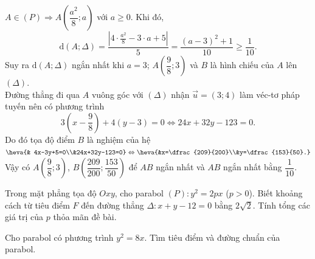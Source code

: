 \begin{ex}
{\begin{itemchoice}
			$A\in (P)\Rightarrow A\left( \dfrac{a^2}{8};a\right)$ với $a\ge 0$. Khi đó,  $$\mathrm{d}(A;\Delta)=\dfrac{\left|4\cdot \frac{a^2}{8} -3\cdot a+5 \right|}{5}=\dfrac{(a-3)^2+1}{10}\ge \dfrac{1}{10}.$$
			Suy ra  $\mathrm{d}(A;\Delta)$ ngắn nhất khi $a=3$; $A\left( \dfrac{9}{8};3\right)$ và $B$ là hình chiếu của $A$ lên $(\Delta)$.\\
			Đường thẳng đi qua $A$ vuông góc với $(\Delta)$ nhận $\overrightarrow{u}=(3;4)$ làm véc-tơ pháp tuyến nên có  phương trình
			$$3\left(x-\dfrac{9}{8}\right)+4(y-3)=0\Leftrightarrow 24x+32y-123=0.$$ 
			Do đó tọa độ điểm $B$ là  nghiệm của hệ $\heva{& 4x-3y+5=0\\&24x+32y-123=0}\Leftrightarrow \heva{&x=\dfrac{209}{200}\\&y=\dfrac{153}{50}.}$\\
			Vậy có $A\left(  \dfrac{9}{8};3\right)$, $B\left( \dfrac{209}{200};\dfrac{153}{50}\right)$ để $AB$ ngắn nhất và $AB$ ngắn nhất bằng $\dfrac{1}{10}$.
		\end{itemchoice}
	 }
\end{ex}



\begin{bt}%
	Trong mặt phẳng tọa độ $Oxy$, cho parabol $(P)\colon y^2=2px$ ($p>0$). Biết khoảng  cách từ tiêu điểm $F$ đến đường thẳng $\Delta\colon x+y-12=0$ bằng $2\sqrt{2}$. Tính tổng các giá trị của $p$ thỏa mãn đề bài.
\end{bt}

\begin{bt}%
	Cho parabol có phương trình $y^{2}=8x$. Tìm tiêu điểm và đường chuẩn của parabol.	
\end{bt}


